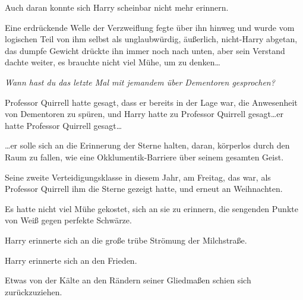 Auch daran konnte sich Harry scheinbar nicht mehr erinnern.

Eine erdrückende Welle der Verzweiflung fegte über ihn hinweg und wurde vom logischen Teil von ihm selbst als unglaubwürdig, äußerlich, nicht-Harry abgetan, das dumpfe Gewicht drückte ihn immer noch nach unten, aber sein Verstand dachte weiter, es brauchte nicht viel Mühe, um zu denken…

\emph{Wann hast du das letzte Mal mit jemandem über Dementoren gesprochen?}

Professor Quirrell hatte gesagt, dass er bereits in der Lage war, die Anwesenheit von Dementoren zu spüren, und Harry hatte zu Professor Quirrell gesagt…er hatte Professor Quirrell gesagt…

…er solle sich an die Erinnerung der Sterne halten, daran, körperlos durch den Raum zu fallen, wie eine Okklumentik-Barriere über seinem gesamten Geist.

Seine zweite Verteidigungsklasse in diesem Jahr, am Freitag, das war, als Professor Quirrell ihm die Sterne gezeigt hatte, und erneut an Weihnachten.

Es hatte nicht viel Mühe gekostet, sich an sie zu erinnern, die sengenden Punkte von Weiß gegen perfekte Schwärze.

Harry erinnerte sich an die große trübe Strömung der Milchstraße.

Harry erinnerte sich an den Frieden.

Etwas von der Kälte an den Rändern seiner Gliedmaßen schien sich zurückzuziehen.

